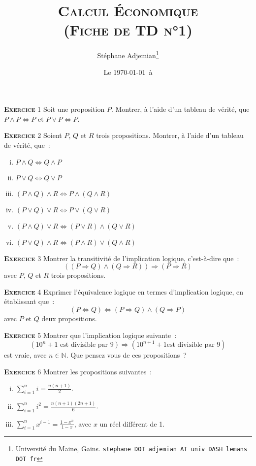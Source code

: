 \documentclass[10pt,a4paper,notitlepage]{article}
\newcommand{\exercice}[1]{\textsc{\textbf{Exercice}} #1}
\begin{document}
\title{\textsc{Calcul Économique\\ \small{(Fiche de TD n°1)}}}
\author{Stéphane Adjemian\thanks{Université du Maine, Gains. \texttt{stephane DOT adjemian AT univ DASH lemans DOT fr}}}
\date{Le \today\ à \thistime}

\maketitle

\exercice{1} Soit une proposition $P$. Montrer, à l'aide d'un tableau
de vérité, que $P \land P \Leftrightarrow P$ et $P \lor P
\Leftrightarrow P$.

\bigskip

\exercice{2} Soient $P$, $Q$ et $R$ trois propositions. Montrer, à l'aide d'un tableau
de vérité, que :
\begin{enumerate}[(i)]
\item $P \land Q \Leftrightarrow Q \land P$
\item $P \lor Q \Leftrightarrow Q \lor P$
\item $(P \land Q) \land R \Leftrightarrow P \land (Q \land R)$
\item $(P \lor Q) \lor R \Leftrightarrow P \lor (Q \lor R)$
\item $(P \land Q) \lor R \Leftrightarrow (P \lor R) \land (Q \lor R)$
\item $(P \lor Q) \land R \Leftrightarrow (P \land R) \lor (Q \land R)$
\end{enumerate}

\bigskip

\exercice{3} Montrer la transitivité de l'implication logique, c'est-à-dire
que :
\[
((P \Rightarrow Q) \land (Q \Rightarrow R)) \Rightarrow (P \Rightarrow R)
\]
avec $P$, $Q$ et $R$ trois propositions.

\bigskip

\exercice{4} Exprimer l'équivalence logique en termes d'implication logique, en
établissant que :
\[
(P \Leftrightarrow Q) \Leftrightarrow (P \Rightarrow Q) \land (Q
\Rightarrow P)
\]
avec $P$ et $Q$ deux propositions.

\bigskip

\exercice{5} Montrer que l'implication logique suivante :
\[
(10^n+1 \text{ est divisible par } 9) \Rightarrow (10^{n+1}+1 \text{
  est divisible par 9})
\]
est vraie, avec $n\in\mathbb N$. Que pensez vous de ces propositions ?

\bigskip

\exercice{6} Montrer les propositions suivantes :
\begin{enumerate}[(i)]
\item $\sum_{i=1}^n i = \frac{n(n+1)}{2}$.
\item $\sum_{i=1}^n i^2 = \frac{n(n+1)(2n+1)}{6}$.
\item $\sum_{i=1}^nx^{i-1} = \frac{1-x^{n}}{1-x}$, avec $x$ un réel différent de 1.
\end{enumerate}
\end{document}
